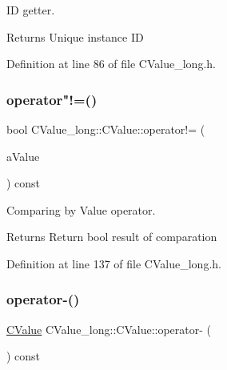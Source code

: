ID getter. 

\begin{DoxyReturn}{Returns}
Unique instance ID 
\end{DoxyReturn}


Definition at line 86 of file C\+Value\+\_\+long.\+h.

\mbox{\label{class_c_value__long_1_1_c_value_a77320781a92d09e2171823eea911eb93}} 
\subsubsection{\texorpdfstring{operator"!=()}{operator!=()}}
{\footnotesize\ttfamily bool C\+Value\+\_\+long\+::\+C\+Value\+::operator!= (\begin{DoxyParamCaption}\item[{const \hyperlink{class_c_value__long_1_1_c_value}{C\+Value} \&}]{a\+Value }\end{DoxyParamCaption}) const\hspace{0.3cm}{\ttfamily [inline]}}



Comparing by Value operator. 

\begin{DoxyReturn}{Returns}
Return {\ttfamily bool} result of comparation 
\end{DoxyReturn}


Definition at line 137 of file C\+Value\+\_\+long.\+h.

\mbox{\label{class_c_value__long_1_1_c_value_a1c73bc6a5bc3fdd11ceb1062932ce771}} 
\subsubsection{\texorpdfstring{operator-\/()}{operator-()}}
{\footnotesize\ttfamily \hyperlink{class_c_value__long_1_1_c_value}{C\+Value} C\+Value\+\_\+long\+::\+C\+Value\+::operator-\/ (\begin{DoxyParamCaption}{ }\end{DoxyParamCaption}) const\hspace{0.3cm}{\ttfamily [inline]}}



